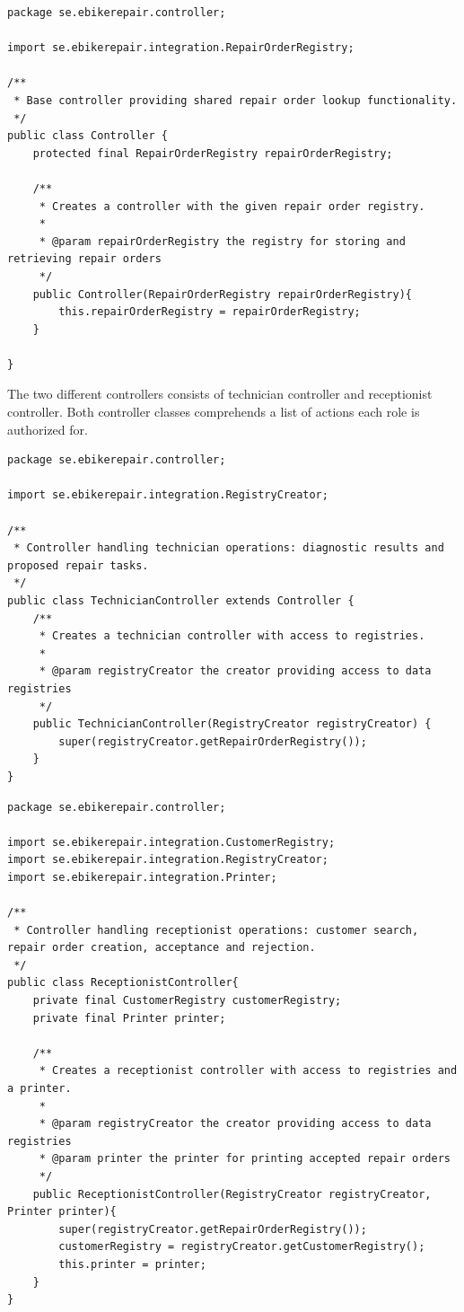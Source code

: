 \documentclass[a4paper]{scrartcl}
\begin{document}
\begin{lstlisting}[style=javastyle, caption={Main class entry point}]
package se.ebikerepair.controller;

import se.ebikerepair.integration.RepairOrderRegistry;

/**
 * Base controller providing shared repair order lookup functionality.
 */
public class Controller {
    protected final RepairOrderRegistry repairOrderRegistry;

    /**
     * Creates a controller with the given repair order registry.
     *
     * @param repairOrderRegistry the registry for storing and retrieving repair orders
     */
    public Controller(RepairOrderRegistry repairOrderRegistry){
        this.repairOrderRegistry = repairOrderRegistry;
    }
    
}

\end{lstlisting}

The two different controllers consists of technician controller and receptionist controller. Both controller classes comprehends a list of actions each role is authorized for.

\begin{lstlisting}[style=javastyle, caption={Main class entry point}]
package se.ebikerepair.controller;

import se.ebikerepair.integration.RegistryCreator;

/**
 * Controller handling technician operations: diagnostic results and proposed repair tasks.
 */
public class TechnicianController extends Controller {
    /**
     * Creates a technician controller with access to registries.
     *
     * @param registryCreator the creator providing access to data registries
     */
    public TechnicianController(RegistryCreator registryCreator) {
        super(registryCreator.getRepairOrderRegistry());
    }
}
\end{lstlisting}

\begin{lstlisting}[style=javastyle, caption={Main class entry point}]
package se.ebikerepair.controller;

import se.ebikerepair.integration.CustomerRegistry;
import se.ebikerepair.integration.RegistryCreator;
import se.ebikerepair.integration.Printer;

/**
 * Controller handling receptionist operations: customer search, repair order creation, acceptance and rejection.
 */
public class ReceptionistController{
    private final CustomerRegistry customerRegistry;
    private final Printer printer;
    
    /**
     * Creates a receptionist controller with access to registries and a printer.
     *
     * @param registryCreator the creator providing access to data registries
     * @param printer the printer for printing accepted repair orders
     */
    public ReceptionistController(RegistryCreator registryCreator, Printer printer){
        super(registryCreator.getRepairOrderRegistry());
        customerRegistry = registryCreator.getCustomerRegistry();
        this.printer = printer;
    }
}

\end{lstlisting}
\end{document}
